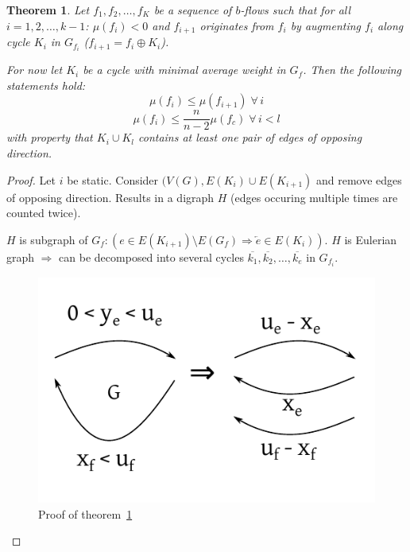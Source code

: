 \documentclass{article}
\newtheorem{theorem}{Theorem}
\newcommand{\fall}{\;\forall\,}
\begin{document}
\begin{theorem}\label{lemma-5.5}
  Let $f_1, f_2, \ldots, f_K$ be a sequence of $b$-flows such that for all $i = 1, 2, \ldots, k-1$:
  $\mu(f_i) < 0$  and $f_{i+1}$ originates from $f_i$ by augmenting $f_i$ along cycle $K_i$ in $G_{f_i}$ ($f_{i+1} = f_i \oplus K_i$).

  For now let $K_i$ be a cycle with minimal average weight in $G_f$. Then the following statements hold:
  \[ \mu(f_i) \leq \mu(f_{i+1}) \fall i \]
  \[ \mu(f_i) \leq \frac{n}{n-2} \mu(f_c) \fall i < l \]
  with property that $K_i \cup K_l$ contains at least one pair of edges of opposing direction.
\end{theorem}

\begin{proof}
  Let $i$ be static. Consider $(V(G), E(K_i) \cup E(K_{i+1})$ and remove edges of opposing direction.
  Results in a digraph $H$ (edges occuring multiple times are counted twice).

  $H$ is subgraph of $G_f: (e \in E(K_{i+1}) \setminus E(G_f) \Rightarrow \overleftarrow{e} \in E(K_i))$.
  $H$ is Eulerian graph $\Rightarrow$ can be decomposed into several cycles $\overline{k_1}, \overline{k_2}, \ldots, \overline{k_e}$ in $G_{f_i}$.

  \begin{figure}[ht]
   \begin{center}
    \includegraphics{img/lemma_5_5.pdf}
    \caption{Proof of theorem~\ref{lemma-5.5}}
   \end{center}
  \end{figure}


\end{proof}
\end{document}
